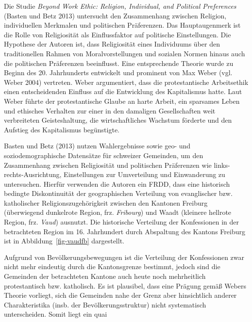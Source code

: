 \documentclass[
  a4paper,
  DIV=11,
  oneside]{scrreprt}
\begin{document}
Die Studie \emph{Beyond Work Ethic: Religion, Individual, and Political
Preferences} (Basten und Betz 2013) untersucht den Zusammenhang zwischen
Religion, individuellen Merkmalen und politischen Präferenzen. Das
Hauptaugenmerk ist die Rolle von Religiosität als Einflussfaktor auf
politische Einstellungen. Die Hypothese der Autoren ist, dass
Religiosität eines Individuums über den traditionellen Rahmen von
Moralvorstellungen und sozialen Normen hinaus auch die politischen
Präferenzen beeinflusst. Eine entsprechende Theorie wurde zu Beginn des
20. Jahrhunderts entwickelt und prominent von Max Weber (vgl. Weber
2004) vertreten. Weber argumentiert, dass die protestantische
Arbeitsethik einen entscheidenden Einfluss auf die Entwicklung des
Kapitalismus hatte. Laut Weber führte der protestantische Glaube an
harte Arbeit, ein sparsames Leben und ethisches Verhalten zur einer in
den damaligen Gesellschaften weit verbreiteten Geisteshaltung, die
wirtschaftliches Wachstum förderte und den Aufstieg des Kapitalismus
begünstigte.

Basten und Betz (2013) nutzen Wahlergebnisse sowie geo- und
soziodemographische Datensätze für schweizer Gemeinden, um den
Zusammenhang zwischen Religiosität und politischen Präferenzen wie
links-rechts-Ausrichtung, Einstellungen zur Umverteilung und
Einwanderung zu untersuchen. Hierfür verwenden die Autoren ein FRDD,
dass eine historisch bedingte Diskontinuität der geographischen
Verteilung von evanglischer bzw. katholischer Religionszugehörigkeit
zwischen den Kantonen Freiburg (überwiegend dunkelrote Region, frz.
\emph{Fribourg}) und Waadt (kleinere hellrote Region, frz. \emph{Vaud})
ausnutzt. Die historische Verteilung der Konfessionen in der
betrachteten Region im 16. Jahrhundert durch Abspaltung des Kantons
Freiburg ist in Abbildung~\ref{fig-vaudfb} dargestellt.

Aufgrund von Bevölkerungsbewegungen ist die Verteilung der Konfessionen
zwar nicht mehr eindeutig durch die Kantonsgrenze bestimmt, jedoch sind
die Gemeinden der betrachteten Kantone auch heute noch mehrheitlich
protestantisch bzw. katholisch. Es ist plausibel, dass eine Prägung
gemäß Webers Theorie vorliegt, sich die Gemeinden nahe der Grenz aber
hinsichtlich anderer Charakteristika (insb. der Bevölkerungsstruktur)
nicht systematisch unterscheiden. Somit liegt ein quai
\end{document}
